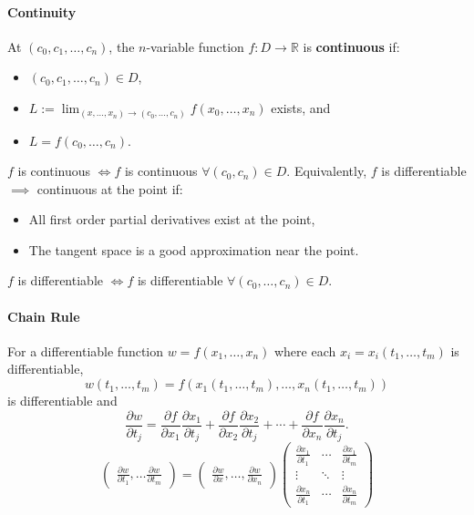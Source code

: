 \paragraph{Continuity}
At $(c_0,c_1,\ldots,c_{n})$, the $n$-variable function $f: D\to \mathbb{R}$ is
\textcolor{Bittersweet}{\textbf{continuous}} if:
\begin{itemize}
  \item $(c_0,c_1,\ldots,c_{n})\in D$,
  \item $L:=\lim_{(x,\ldots,x_{n}) \to (c_0,\ldots,c_{n})} f(x_0,\ldots,x_{n})$ exists, and
  \item $L=f(c_0,\ldots,c_{n})$.
\end{itemize}
$f$ is \textcolor{Bittersweet}{continuous} $\iff f$ is continuous $\forall
\left( c_0,c_{n} \right) \in D$.
Equivalently, $f$ is differentiable $\implies$ continuous at the point if:
\begin{itemize}
  \item All first order partial derivatives exist at the point,
  \item The tangent space is a good approximation near the point.
\end{itemize}
$f$ is \textcolor{Bittersweet}{differentiable} $\iff f$ is differentiable
$\forall \left( c_0,\ldots,c_{n} \right) \in D$.

\paragraph{Chain Rule}
For a differentiable function $w=f\left( x_1,\ldots,x_{n} \right)$
where each $x_i=x_i\left( t_1,\ldots,t_m \right) $ is differentiable,
\[w(t_1,\ldots,t_m)=f(x_1( t_1,\ldots,t_m),\ldots,x_{n}( t_1,\ldots,t_m ))\]
is differentiable and
\[\frac{\partial w}{\partial t_j} =\frac{\partial f}{\partial x_1}
\frac{\partial x_1}{\partial t_j}+\frac{\partial f}{\partial x_2}
\frac{\partial x_2}{\partial t_j} +\cdots+\frac{\partial f}{\partial x_{n}}
\frac{\partial x_{n}}{\partial t_j}.\] 
\[
  \begin{pmatrix}
    \frac{\partial w}{\partial t_1} ,\ldots \frac{\partial w}{\partial t_m} 
    
  \end{pmatrix}=\begin{pmatrix}
    \frac{\partial w}{\partial x} ,\ldots,\frac{\partial w}{\partial x_{n}} 
  \end{pmatrix} \begin{pmatrix}
  \frac{\partial x_1}{\partial t_1} & \cdots & \frac{\partial x_1}{\partial t_m} \\
  \vdots & \ddots & \vdots\\
  \frac{\partial x_{n}}{\partial t_1} & \cdots & \frac{\partial x_{n}}{\partial t_m} 
  \end{pmatrix}
\]
